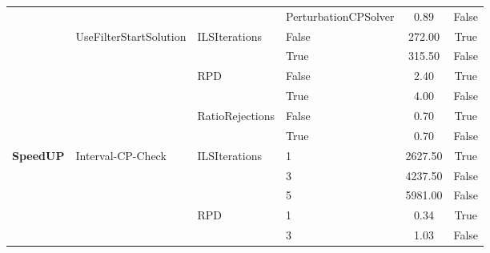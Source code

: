 \begin{table}[!ht]
\begin{tabular}{@{}l|l|l|l|c|c @{}}
		                                   &                                           &                                  & PerturbationCPSolver & 0.89            & False           \\\cline{2-6}
		                                   & \multirow{6}{*}{UseFilterStartSolution}   & \multirow{2}{*}{ILSIterations}   & False                & 272.00          & True            \\\cline{4-6}
		                                   &                                           &                                  & True                 & 315.50          & False           \\\cline{3-6}
		                                   &                                           & \multirow{2}{*}{RPD}             & False                & 2.40            & True            \\\cline{4-6}
		                                   &                                           &                                  & True                 & 4.00            & False           \\\cline{3-6}
		                                   &                                           & \multirow{2}{*}{RatioRejections} & False                & 0.70            & True            \\\cline{4-6}
		                                   &                                           &                                  & True                 & 0.70            & False           \\\hline
		\multirow{15}{*}{\textbf{SpeedUP}} & \multirow{9}{*}{Interval-CP-Check}        & \multirow{3}{*}{ILSIterations}   & 1                    & 2627.50         & True            \\\cline{4-6}
		                                   &                                           &                                  & 3                    & 4237.50         & False           \\\cline{4-6}
		                                   &                                           &                                  & 5                    & 5981.00         & False           \\\cline{3-6}
		                                   &                                           & \multirow{3}{*}{RPD}             & 1                    & 0.34            & True            \\\cline{4-6}
		                                   &                                           &                                  & 3                    & 1.03            & False           \\\cline{4-6}

\end{tabular}
\end{table}
